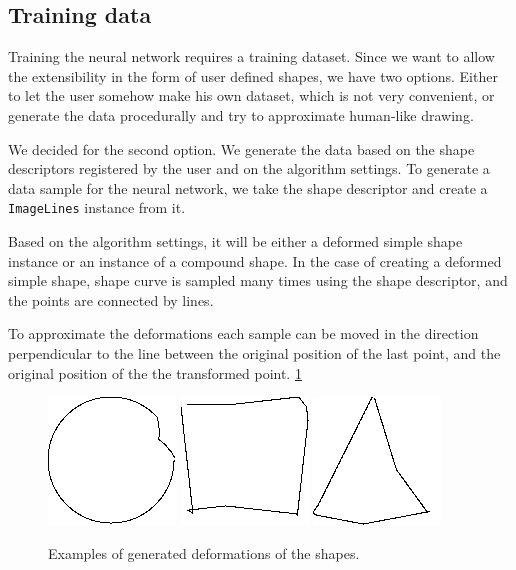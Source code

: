 \subsection{Training data}
Training the neural network requires a training dataset. Since we want to allow the extensibility in the form of user defined shapes, we have two options. Either to let the user somehow make his own dataset, which is not very convenient, or generate the data procedurally and try to approximate human-like drawing.

We decided for the second option. We generate the data based on the shape descriptors registered by the user and on the algorithm settings. To generate a data sample for the neural network, we take the shape descriptor and create a \texttt{ImageLines} instance from it.

Based on the algorithm settings, it will be either a deformed simple shape instance or an instance of a compound shape. In the case of creating a deformed simple shape, shape curve is sampled many times using the shape descriptor, and the points are connected by lines.
 
To approximate the deformations each sample can be moved in the direction perpendicular to the line between the original position of the last point, and the original position of the the transformed point. \ref{deformed} 

\begin{figure}
\centering
\includegraphics[width=.3\linewidth]{ext/images/deformed0.png}
\quad
\includegraphics[width=.3\linewidth]{ext/images/deformed1.png}
\quad
\includegraphics[width=.3\linewidth]{ext/images/deformed2.png}

\caption{Examples of generated deformations of the shapes.}
\label{deformed}
\end{figure}


